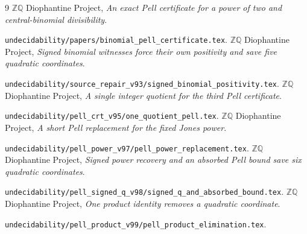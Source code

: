 \documentclass[11pt]{article}
\begin{document}
\begin{thebibliography}{9}
\small\setlength{\itemsep}{2pt}
 \(\mathbb Z\mathbb Q\) Diophantine Project,
\emph{An exact Pell certificate for a power of two and central-binomial
divisibility}.\par
\nolinkurl{undecidability/papers/binomial_pell_certificate.tex}.
 \(\mathbb Z\mathbb Q\) Diophantine Project,
\emph{Signed binomial witnesses force their own positivity and save
five quadratic coordinates}.\par
\nolinkurl{undecidability/source_repair_v93/signed_binomial_positivity.tex}.
 \(\mathbb Z\mathbb Q\) Diophantine Project,
\emph{A single integer quotient for the third Pell certificate}.\par
\nolinkurl{undecidability/pell_crt_v95/one_quotient_pell.tex}.
 \(\mathbb Z\mathbb Q\) Diophantine Project,
\emph{A short Pell replacement for the fixed Jones power}.\par
\nolinkurl{undecidability/pell_power_v97/pell_power_replacement.tex}.
 \(\mathbb Z\mathbb Q\) Diophantine Project,
\emph{Signed power recovery and an absorbed Pell bound save six
quadratic coordinates}.\par
\nolinkurl{undecidability/pell_signed_q_v98/signed_q_and_absorbed_bound.tex}.
 \(\mathbb Z\mathbb Q\) Diophantine Project,
\emph{One product identity removes a quadratic coordinate}.\par
\nolinkurl{undecidability/pell_product_v99/pell_product_elimination.tex}.
\end{thebibliography}
\end{document}
